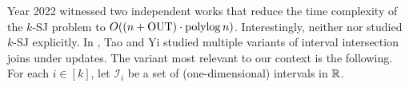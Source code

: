 \documentclass[sigconf]{acmart}
\def\vgap{\vspace{0mm}}
\def\I{\mathcal{I}}
\def\out{\mathrm{OUT}}
\begin{document}
\vgap

Year 2022 witnessed two independent works \cite{ty22,???} that reduce the time complexity of the $k$-SJ problem to $O((n + \out) \cdot \polylog n)$. Interestingly, neither \cite{ty22} nor \cite{???} studied $k$-SJ explicitly. In \cite{ty22}, Tao and Yi studied multiple variants of interval intersection joins under updates. The variant most relevant to our context is the following. For each $i \in [k]$, let $\I_i$ be a set of (one-dimensional) intervals in $\mathbb{R}$.



\balance

\end{document}

